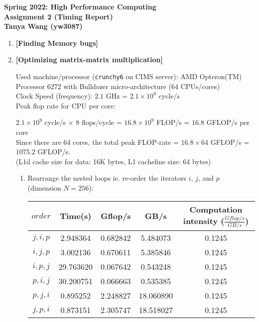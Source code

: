 \documentclass[11pt]{article}
\begin{document}
\begin{center}
\vspace*{-2cm}

\end{center}
\vspace*{.5cm}
\begin{center}
\large \textbf{%
Spring 2022: High Performance Computing}\\
\textbf{ Assignment 2 (Timing Report)}\\
\large \textbf{%
Tanya Wang (yw3087)}\\
\end{center}


\begin{enumerate}
    \item {\bf [Finding Memory bugs]}
    
    
    \item {\bf [Optimizing matrix-matrix multiplication]}
    
    Used machine/processor (\texttt{crunchy6} on CIMS server): AMD Opteron(TM) Processor 6272 with Bulldozer micro-architecture (64 CPUs/cores)\\
    Clock Speed (frequency): $2.1$ GHz = $2.1\times 10^9$ cycle/s\\
    Peak flop rate for CPU per core:
        
        $2.1\times 10^9$ cycle/s $\times$ $8$ flops/cycle = $16.8 \times 10^9$ FLOP/s = $16.8$ GFLOP/s per core\\
    Since there are 64 cores, the total peak FLOP-rate = $16.8\times 64$ GFLOP/s = $1075.2$ GFLOP/s.\\
   (L1d cache size for data: 16K bytes, L1 cacheline size: 64 bytes)
    
    \begin{enumerate}
        \item Rearrange the nested loops ie. re-order the iterators $i$, $j$, and $p$ (dimension $N=256$):
        
            \begin{tabular}{c|c|c|c|c}
           $order$ & Time(s) & Gflop/s & GB/s & Computation intensity ($\frac{Gflop/s}{GB/s}$) \\ \hline
            ${j,i,p}$ & 2.948364 & 0.682842 & 5.484073 & 0.1245 \\
            ${i,j,p}$ & 3.002136 & 0.670611 & 5.385846 & 0.1245 \\
            ${i,p,j}$ & 29.763620 & 0.067642 & 0.543248 & 0.1245 \\
            ${p,i,j}$ & 30.200751 & 0.066663 & 0.535385 & 0.1245 \\
            ${p,j,i}$ & 0.895252 & 2.248827 & 18.060890 & 0.1245 \\
            ${j,p,i}$ & 0.873151 & 2.305747 & 18.518027 & 0.1245 \\
            

\end{tabular}
\end{enumerate}
\end{enumerate}
\end{document}
